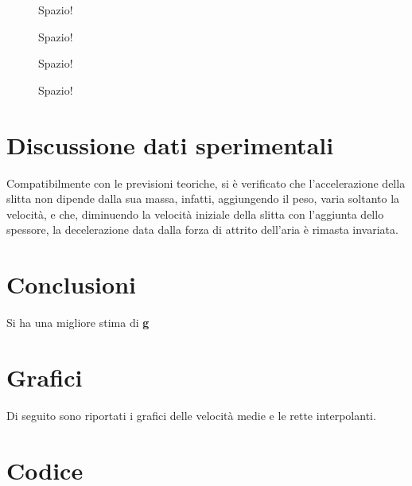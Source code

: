 \documentclass[12pt]{article} %
\begin{document}
	\begin{figure}[H]
    \centering
		
		\caption{Spazio!}
		\label{fig:spazio1}
	\end{figure}
	
	\begin{figure}[H]
    \centering
		
		\caption{Spazio!}
		\label{fig:spazio1}
	\end{figure}
	
	\begin{figure}[H]
    \centering
		
		\caption{Spazio!}
		\label{fig:spazio1}
	\end{figure}
	
	\begin{figure}[H]
    \centering
		
		\caption{Spazio!}
		\label{fig:spazio1}
	\end{figure}


\section{Discussione dati sperimentali}
	Compatibilmente con le previsioni teoriche, si è verificato che l'accelerazione della slitta non dipende dalla sua massa, infatti, 		aggiungendo il peso, varia soltanto la velocità, e che, diminuendo la velocità iniziale della slitta con l'aggiunta dello spessore, 		la decelerazione data dalla forza di attrito dell'aria è rimasta invariata. 

\section{Conclusioni}
	Si ha una migliore stima di \textbf{g} 
	
\section {Grafici}
	Di seguito sono riportati i grafici delle velocità medie e le rette interpolanti.
	\subsection {}
	
\section{Codice}	
\end{document}
